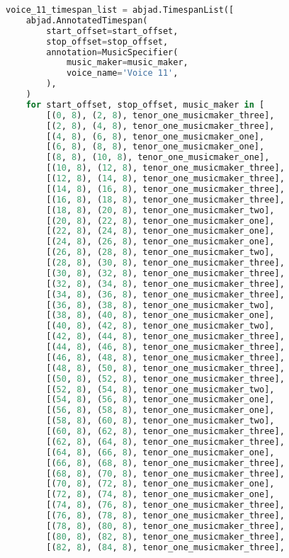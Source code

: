 \begin{lstlisting}[language=Python, caption=Invocation Source Code]
voice_11_timespan_list = abjad.TimespanList([
    abjad.AnnotatedTimespan(
        start_offset=start_offset,
        stop_offset=stop_offset,
        annotation=MusicSpecifier(
            music_maker=music_maker,
            voice_name='Voice 11',
        ),
    )
    for start_offset, stop_offset, music_maker in [
        [(0, 8), (2, 8), tenor_one_musicmaker_three],
        [(2, 8), (4, 8), tenor_one_musicmaker_three],
        [(4, 8), (6, 8), tenor_one_musicmaker_one],
        [(6, 8), (8, 8), tenor_one_musicmaker_one],
        [(8, 8), (10, 8), tenor_one_musicmaker_one],
        [(10, 8), (12, 8), tenor_one_musicmaker_three],
        [(12, 8), (14, 8), tenor_one_musicmaker_three],
        [(14, 8), (16, 8), tenor_one_musicmaker_three],
        [(16, 8), (18, 8), tenor_one_musicmaker_three],
        [(18, 8), (20, 8), tenor_one_musicmaker_two],
        [(20, 8), (22, 8), tenor_one_musicmaker_one],
        [(22, 8), (24, 8), tenor_one_musicmaker_one],
        [(24, 8), (26, 8), tenor_one_musicmaker_one],
        [(26, 8), (28, 8), tenor_one_musicmaker_two],
        [(28, 8), (30, 8), tenor_one_musicmaker_three],
        [(30, 8), (32, 8), tenor_one_musicmaker_three],
        [(32, 8), (34, 8), tenor_one_musicmaker_three],
        [(34, 8), (36, 8), tenor_one_musicmaker_three],
        [(36, 8), (38, 8), tenor_one_musicmaker_two],
        [(38, 8), (40, 8), tenor_one_musicmaker_one],
        [(40, 8), (42, 8), tenor_one_musicmaker_two],
        [(42, 8), (44, 8), tenor_one_musicmaker_three],
        [(44, 8), (46, 8), tenor_one_musicmaker_three],
        [(46, 8), (48, 8), tenor_one_musicmaker_three],
        [(48, 8), (50, 8), tenor_one_musicmaker_three],
        [(50, 8), (52, 8), tenor_one_musicmaker_three],
        [(52, 8), (54, 8), tenor_one_musicmaker_two],
        [(54, 8), (56, 8), tenor_one_musicmaker_one],
        [(56, 8), (58, 8), tenor_one_musicmaker_one],
        [(58, 8), (60, 8), tenor_one_musicmaker_two],
        [(60, 8), (62, 8), tenor_one_musicmaker_three],
        [(62, 8), (64, 8), tenor_one_musicmaker_three],
        [(64, 8), (66, 8), tenor_one_musicmaker_one],
        [(66, 8), (68, 8), tenor_one_musicmaker_three],
        [(68, 8), (70, 8), tenor_one_musicmaker_three],
        [(70, 8), (72, 8), tenor_one_musicmaker_one],
        [(72, 8), (74, 8), tenor_one_musicmaker_one],
        [(74, 8), (76, 8), tenor_one_musicmaker_three],
        [(76, 8), (78, 8), tenor_one_musicmaker_three],
        [(78, 8), (80, 8), tenor_one_musicmaker_three],
        [(80, 8), (82, 8), tenor_one_musicmaker_three],
        [(82, 8), (84, 8), tenor_one_musicmaker_three],

\end{lstlisting}
